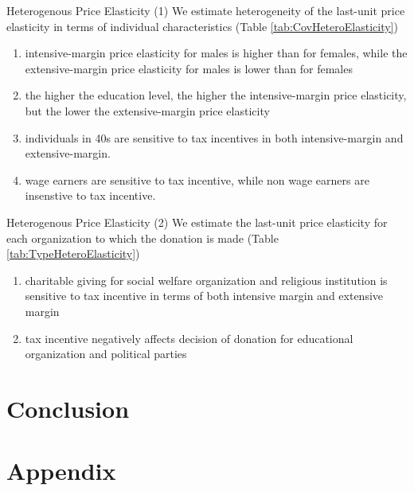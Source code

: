 \documentclass[
  ignorenonframetext,
  aspectratio=169,
]{beamer}
\providecommand{\tightlist}{%
  \setlength{\itemsep}{0pt}\setlength{\parskip}{0pt}}
\begin{document}
\begin{frame}{Heterogenous Price Elasticity (1)}
\protect\hypertarget{heterogenous-price-elasticity-1}{}
We estimate heterogeneity of the last-unit price elasticity in terms of individual characteristics (Table \ref{tab:CovHeteroElasticity})

\begin{enumerate}
\tightlist
\item
  intensive-margin price elasticity for males is higher than for females, while the extensive-margin price elasticity for males is lower than for females
\item
  the higher the education level, the higher the intensive-margin price elasticity, but the lower the extensive-margin price elasticity
\item
  individuals in 40s are sensitive to tax incentives in both intensive-margin and extensive-margin.
\item
  wage earners are sensitive to tax incentive, while non wage earners are insenstive to tax incentive.
\end{enumerate}
\end{frame}

\begin{frame}{Heterogenous Price Elasticity (2)}
\protect\hypertarget{heterogenous-price-elasticity-2}{}
We estimate the last-unit price elasticity for each organization to which the donation is made
(Table \ref{tab:TypeHeteroElasticity})

\begin{enumerate}
\tightlist
\item
  charitable giving for social welfare organization and religious institution is sensitive to tax incentive in terms of both intensive margin and extensive margin
\item
  tax incentive negatively affects decision of donation for educational organization and political parties
\end{enumerate}
\end{frame}

\hypertarget{conclusion}{%
\section{Conclusion}\label{conclusion}}

\hypertarget{appendix}{%
\section{Appendix}\label{appendix}}
\end{document}
